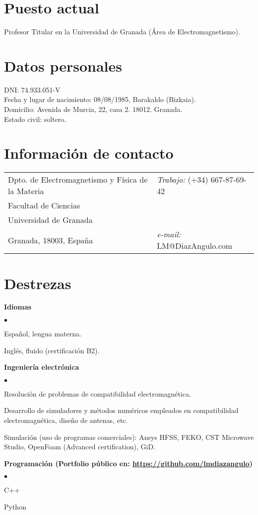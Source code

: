 \documentclass[margin,line]{res}
\newenvironment{list2}{
  \begin{list}{$\bullet$}{%
      \setlength{\itemsep}{0in}
      \setlength{\parsep}{0in} \setlength{\parskip}{0in}
      \setlength{\topsep}{0in} \setlength{\partopsep}{0in} 
      \setlength{\leftmargin}{0.2in}}}{\end{list}}
\begin{document}

\begin{resume}
\section{\sc Puesto actual}
 Profesor Titular en la Universidad de Granada (Área de Electromagnetismo).
 
\section{\sc Datos personales}
DNI: 74.933.051-V\\
Fecha y lugar de nacimiento: 08/08/1985, Barakaldo (Bizkaia).\\
Domicilio: Avenida de Murcia, 22, casa 2. 18012. Granada.\\
Estado civil: soltero.
 
\section{\sc Información de contacto}
\vspace{.05in}
\begin{tabular}{@{}p{3.1in}p{4in}}
Dpto. de Electromagnetismo y Física de la Materia  & {\it Trabajo:}  (+34) 667-87-69-42 \\            
Facultad de Ciencias& \\         
Universidad de Granada & \\
Granada, 18003, España            &{\it e-mail:}  LM@DiazAngulo.com
\end{tabular}

\section{\sc Destrezas} 
 {\bf Idiomas}
  \begin{list2}
   \item Español, lengua materna.
   \item Inglés, fluido (certificación B2).
  \end{list2}
  {\bf Ingeniería electrónica}
  \begin{list2} 
   \item Resolución de problemas de compatibilidad electromagnética. 
   \item Desarrollo de simuladores y métodos numéricos empleados en compatibilidad electromagnética, diseño de antenas, etc. 
   \item Simulación (uso de programas comerciales): Ansys HFSS, FEKO, CST Microwave Studio, OpenFoam (Advanced certification), GiD.
  \end{list2}
 {\bf Programación (Portfolio público en: \url{https://github.com/lmdiazangulo})}
 \begin{list2} 
  \item C++
  \item Python
 \end{list2}
 

\end{resume}
\end{document}

